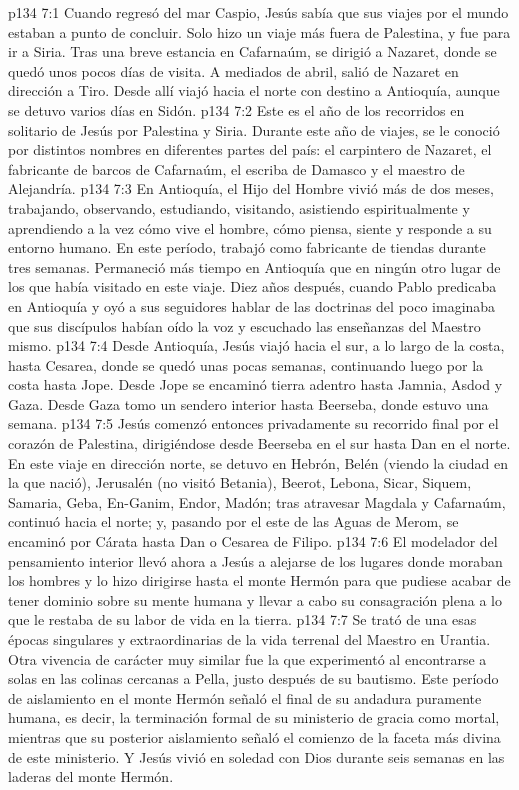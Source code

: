 \vs p134 7:1 Cuando regresó del mar Caspio, Jesús sabía que sus viajes por el mundo estaban a punto de concluir. Solo hizo un viaje más fuera de Palestina, y fue para ir a Siria. Tras una breve estancia en Cafarnaúm, se dirigió a Nazaret, donde se quedó unos pocos días de visita. A mediados de abril, salió de Nazaret en dirección a Tiro. Desde allí viajó hacia el norte con destino a Antioquía, aunque se detuvo varios días en Sidón.
\vs p134 7:2 Este es el año de los recorridos en solitario de Jesús por Palestina y Siria. Durante este año de viajes, se le conoció por distintos nombres en diferentes partes del país: el carpintero de Nazaret, el fabricante de barcos de Cafarnaúm, el escriba de Damasco y el maestro de Alejandría.
\vs p134 7:3 En Antioquía, el Hijo del Hombre vivió más de dos meses, trabajando, observando, estudiando, visitando, asistiendo espiritualmente y aprendiendo a la vez cómo vive el hombre, cómo piensa, siente y responde a su entorno humano. En este período, trabajó como fabricante de tiendas durante tres semanas. Permaneció más tiempo en Antioquía que en ningún otro lugar de los que había visitado en este viaje. Diez años después, cuando Pablo predicaba en Antioquía y oyó a sus seguidores hablar de las doctrinas del  poco imaginaba que sus discípulos habían oído la voz y escuchado las enseñanzas del Maestro mismo.
\vs p134 7:4 Desde Antioquía, Jesús viajó hacia el sur, a lo largo de la costa, hasta Cesarea, donde se quedó unas pocas semanas, continuando luego por la costa hasta Jope. Desde Jope se encaminó tierra adentro hasta Jamnia, Asdod y Gaza. Desde Gaza tomo un sendero interior hasta Beerseba, donde estuvo una semana.
\vs p134 7:5 Jesús comenzó entonces privadamente su recorrido final por el corazón de Palestina, dirigiéndose desde Beerseba en el sur hasta Dan en el norte. En este viaje en dirección norte, se detuvo en Hebrón, Belén (viendo la ciudad en la que nació), Jerusalén (no visitó Betania), Beerot, Lebona, Sicar, Siquem, Samaria, Geba, En\hyp{}Ganim, Endor, Madón; tras atravesar Magdala y Cafarnaúm, continuó hacia el norte; y, pasando por el este de las Aguas de Merom, se encaminó por Cárata hasta Dan o Cesarea de Filipo.
\vs p134 7:6 El modelador del pensamiento interior llevó ahora a Jesús a alejarse de los lugares donde moraban los hombres y lo hizo dirigirse hasta el monte Hermón para que pudiese acabar de tener dominio sobre su mente humana y llevar a cabo su consagración plena a lo que le restaba de su labor de vida en la tierra.
\vs p134 7:7 Se trató de una esas épocas singulares y extraordinarias de la vida terrenal del Maestro en Urantia. Otra vivencia de carácter muy similar fue la que experimentó al encontrarse a solas en las colinas cercanas a Pella, justo después de su bautismo. Este período de aislamiento en el monte Hermón señaló el final de su andadura puramente humana, es decir, la terminación formal de su ministerio de gracia como mortal, mientras que su posterior aislamiento señaló el comienzo de la faceta más divina de este ministerio. Y Jesús vivió en soledad con Dios durante seis semanas en las laderas del monte Hermón.
